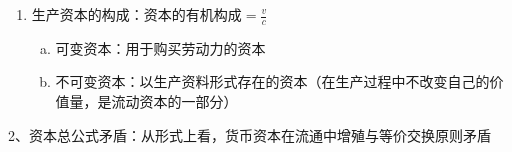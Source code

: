 \documentclass[12pt]{book}
\begin{document}
{\begin{enumerate}[1.]
\begin{enumerate}[(1)]
\begin{enumerate}[a.]
{                                      \par (1) 折旧
                                      \par a. 定义：对固定资本价值转移量的计算以及从商品销售中逐步提取和回收这部分价值的方式
                                      \par b. 原因：损耗
                                      \par (a) 有形损耗（物质磨损）：使用；自然力
                                      \par (b) 无形损耗（精神磨损）：生产技术进步，生产效率提高，生产同类机器设备的社会必要劳动时间减少；科技创新，更好的机器设备
                                      \par * 流动资本：以原料、燃料及动力、辅助材料等劳动对象形式存在的以及用于购买劳动力的那部分生产资本（劳动对象，劳动者）
                                      \par * 固定资产：多个生产过程中价值分批转移，分批回收；较长的有效使用期内不必更新；回收期、周转期长
                                      \par * 流动资产：一个生产过程中价值一次全部转移，通过产品出售一次全部回收；每一生产周期前需更新；回收期、周转期短
                                  }
                        \end{enumerate}
                  \item 生产资本的构成：$\text{资本的有机构成}=\frac{v}{c}$
                        \begin{enumerate}[a.]
                            \item 可变资本：用于购买劳动力的资本
                            \item 不可变资本：以生产资料形式存在的资本（在生产过程中不改变自己的价值量，是流动资本的一部分）
                        \end{enumerate}
              \end{enumerate}
    \end{enumerate}
}

2、资本总公式矛盾：从形式上看，货币资本在流通中增殖与等价交换原则矛盾


\end{document}
